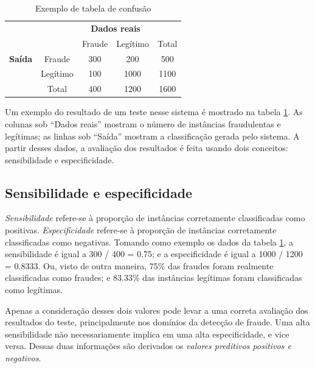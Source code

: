 \vspace{0.5cm}
\renewcommand{\arraystretch}{1.5}
\begin{table}[h]
    \centering
    \caption{Exemplo de tabela de confusão}
    \label{fraud:ex}
    \vspace{0.5cm}
    \begin{tabular}{c l c c c}
        & & \multicolumn{2}{c}{\textbf{Dados reais}} \\
        \multirow{3}{5mm}{\begin{sideways}\parbox{20mm}{\textbf{Saída}}\end{sideways}} & \multicolumn{1}{c|}{} & Fraude & Legítimo & \multicolumn{1}{|c}{Total} \\
        \cline{2-5}
        & \multicolumn{1}{c|}{Fraude}   & 300 & 200   & \multicolumn{1}{|c}{500}  \\
        & \multicolumn{1}{c|}{Legítimo} & 100 & 1000  & \multicolumn{1}{|c}{1100} \\
        \cline{2-5}
        & \multicolumn{1}{c|}{Total}    & 400 & 1200  & \multicolumn{1}{|c}{1600} \\
    \end{tabular}
\end{table}
\vspace{0.5cm}

Um exemplo do resultado de um teste nesse sistema é mostrado na tabela \ref{fraud:ex}. As colunas sob ``Dados reais'' mostram o número de instâncias fraudulentas e legítimas; as linhas sob ``Saída'' mostram a classificação gerada pelo sistema. A partir desses dados, a avaliação dos resultados é feita usando dois conceitos: sensibilidade e especificidade.

\subsection{Sensibilidade e especificidade}

\emph{Sensibilidade} refere-se à proporção de instâncias corretamente classificadas como positivas. \emph{Especificidade} refere-se à proporção de instâncias corretamente classificadas como negativas. Tomando como exemplo os dados da tabela \ref{fraud:ex}, a sensibilidade é igual a 300 / 400 = 0.75; e a especificidade é igual a 1000 / 1200 = 0.8333. Ou, visto de outra maneira, 75\% das fraudes foram realmente classificadas como fraudes; e 83.33\% das instâncias legítimas foram classificadas como legítimas.

Apenas a consideração desses dois valores pode levar a uma correta avaliação dos resultados do teste, principalmente nos domínios da detecção de fraude. Uma alta sensibilidade não necessariamente implica em uma alta especificidade, e vice versa. Dessas duas informações são derivados os \emph{valores preditivos positivos e negativos}.

